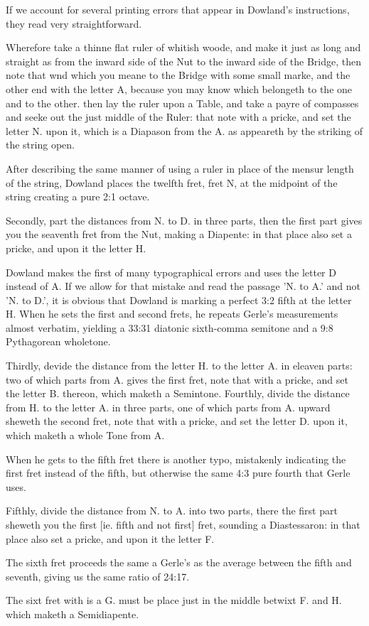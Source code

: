 If we account for several printing errors that appear in Dowland's instructions, they
read very straightforward.
\begin{blocks}
Wherefore take a thinne flat ruler of whitish woode, and make it just as long and
straight as from the inward side of the Nut to the inward side of the Bridge, then note
that wnd which you meane to the Bridge with some small marke, and the other end with
the letter A, because you may know which belongeth to the one and to the other. then
lay the ruler upon a Table, and take a payre of compasses and seeke out the just middle
of the Ruler: that note with a pricke, and set the letter N. upon it, which is a
Diapason from the A. as appeareth by the striking of the string open.
\end{blocks}
After describing the same manner of using a ruler in place of the mensur length of the
string, Dowland places the twelfth fret, fret N, at the midpoint of the string creating
a pure 2:1 octave.
\begin{blocks}
Secondly, part the distances from N. to D. in three parts, then the first part gives
you the seaventh fret from the Nut, making a Diapente: in that place also set a pricke,
and upon it the letter H.
\end{blocks}
Dowland makes the first of many typographical errors and uses the letter D instead of
A. If we allow for that mistake and read the passage 'N. to A.' and not 'N. to D.', it
is obvious that Dowland is marking a perfect 3:2 fifth at the letter H.  When he sets
the first and second frets, he repeats Gerle's measurements almost verbatim, yielding a
33:31 diatonic sixth-comma semitone and a 9:8 Pythagorean wholetone.
\begin{blocks}
Thirdly, devide the distance from the letter H. to the letter A. in eleaven parts: two
of which parts from A. gives the first fret, note that with a pricke, and set the
letter B. thereon, which maketh a Semintone.  Fourthly, divide the distance from H. to
the letter A. in three parts, one of which parts from A. upward sheweth the second
fret, note that with a pricke, and set the letter D. upon it, which maketh a whole Tone
from A.
\end{blocks}
When he gets to the fifth fret there is another typo, mistakenly indicating the first
fret instead of the fifth, but otherwise the same 4:3 pure fourth that Gerle uses.
\begin{blocks}
Fifthly, divide the distance from N. to A. into two parts, there the first part sheweth
you the first [ie. fifth and not first] fret, sounding a Diastessaron: in that place
also set a pricke, and upon it the letter F.
\end{blocks}
The sixth fret proceeds the same a Gerle's as the average between the fifth and
seventh, giving us the same ratio of 24:17.
\begin{blocks}
The sixt fret with is a G. must be place just in the middle betwixt F. and H. which
maketh a Semidiapente.
\end{blocks}

